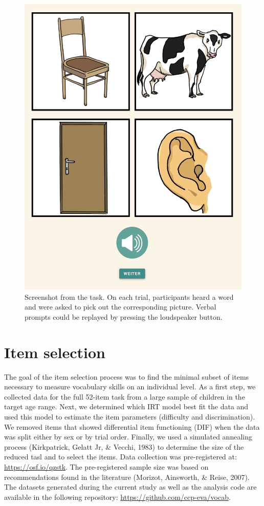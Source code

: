 \documentclass[
  man,floatsintext]{apa6}
\begin{document}
\begin{figure}

{\centering \includegraphics[width=0.5\linewidth]{../graphs/task_fig} 

}

\caption{Screenshot from the task. On each trial, participants heard a word and were asked to pick out the corresponding picture. Verbal prompts could be replayed by pressing the loudspeaker button.}\label{fig:fig1}
\end{figure}

\hypertarget{item-selection}{%
\section{Item selection}\label{item-selection}}

The goal of the item selection process was to find the minimal subset of items necessary to measure vocabulary skills on an individual level. As a first step, we collected data for the full 52-item task from a large sample of children in the target age range. Next, we determined which IRT model best fit the data and used this model to estimate the item parameters (difficulty and discrimination). We removed items that showed differential item functioning (DIF) when the data was split either by sex or by trial order. Finally, we used a simulated annealing process (Kirkpatrick, Gelatt Jr, \& Vecchi, 1983) to determine the size of the reduced tasl and to select the items. Data collection was pre-registered at: \url{https://osf.io/qzstk}. The pre-registered sample size was based on recommendations found in the literature (Morizot, Ainsworth, \& Reise, 2007). The datasets generated during the current study as well as the analysis code are available in the following repository: \url{https://github.com/ccp-eva/vocab}.
\end{document}
